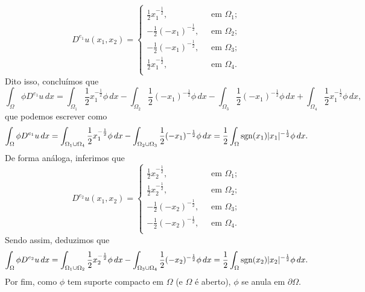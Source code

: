 \begin{ex}
    \begin{equation}
        D^{e_1}u(x_1,x_2) =
        \left\{
            \begin{array}{lr}
                \frac{1}{2}x_1^{-\frac{1}{2}}, &\;\text{ em } \Omega_1;\\
                -\frac{1}{2}(-x_1)^{-\frac{1}{2}}, &\;\text{ em } \Omega_2;\\
                -\frac{1}{2}(-x_1)^{-\frac{1}{2}}, &\;\text{ em } \Omega_3;\\
                \frac{1}{2}x_1^{-\frac{1}{2}}, &\;\text{ em } \Omega_4.\\
            \end{array}
        \right.
    \end{equation}
    Dito isso, concluímos que
    \[
        \int_\Omega \phi D^{e_1}u \,dx = \int_{\Omega_1}  \frac{1}{2} x_1^{-\frac{1}{2}}\phi \,dx - \int_{\Omega_2} \frac{1}{2} (-x_1)^{-\frac{1}{2}} \phi \,dx - \int_{\Omega_3} \frac{1}{2} (-x_1)^{-\frac{1}{2}} \phi \,dx + \int_{\Omega_4} \frac{1}{2} x_1^{-\frac{1}{2}} \phi \,dx,
    \]
    que podemos escrever como
    \[
        \int_\Omega \phi D^{e_1} u \,dx = \int_{\Omega_1 \cup \Omega_4}  \frac{1}{2} x_1^{-\frac{1}{2}}\phi \,dx - \int_{\Omega_2 \cup \Omega_3} \frac{1}{2} (-x_1)^{-\frac{1}{2}} \phi \,dx = \frac{1}{2}\int_\Omega \mathrm{sgn}(x_1) |x_1|^{-\frac{1}{2}} \phi \,dx.
    \]
    De forma análoga, inferimos que
    \begin{equation}
        D^{e_2}u(x_1,x_2) =
        \left\{
            \begin{array}{lr}
                \frac{1}{2}x_2^{-\frac{1}{2}}, &\;\text{ em } \Omega_1;\\
                \frac{1}{2}x_2^{-\frac{1}{2}}, &\;\text{ em } \Omega_2;\\
                -\frac{1}{2}(-x_2)^{-\frac{1}{2}}, &\;\text{ em } \Omega_3;\\
                -\frac{1}{2}(-x_2)^{-\frac{1}{2}}, &\;\text{ em } \Omega_4.\\
            \end{array}
        \right.
    \end{equation}
    Sendo assim, deduzimos que
    \[
        \int_\Omega \phi D^{e_2} u \,dx = \int_{\Omega_1 \cup \Omega_2}  \frac{1}{2} x_2^{-\frac{1}{2}}\phi \,dx - \int_{\Omega_3 \cup \Omega_4} \frac{1}{2} (-x_2)^{-\frac{1}{2}} \phi \,dx = \frac{1}{2}\int_\Omega \mathrm{sgn}(x_2) |x_2|^{-\frac{1}{2}} \phi \,dx.
    \]
    Por fim, como $\phi$ tem suporte compacto em $\Omega$ (e $\Omega$ é aberto), $\phi$ se anula em $\partial\Omega$.

\end{ex}
